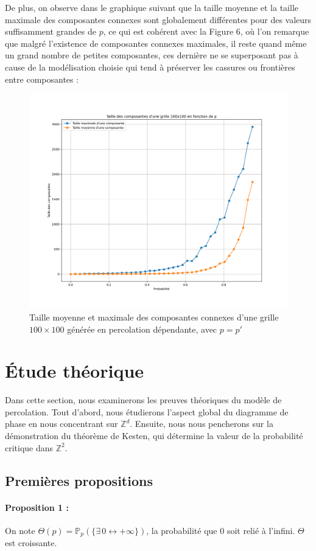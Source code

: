 \documentclass[11pt,a4paper]{article}
\begin{document}
 De plus, on observe dans le graphique suivant que la taille moyenne et la taille maximale des composantes connexes sont globalement différentes pour des valeurs suffisamment grandes de $p$, ce qui est cohérent avec la Figure $6$, où l'on remarque que malgré l'existence de composantes connexes maximales, il reste quand même un grand nombre de petites composantes, ces dernière ne se superposant pas à cause de la modélisation choisie qui tend à préserver les cassures ou frontières entre composantes :

\begin{figure}[H]
    \centering
    \includegraphics[width=0.5 \textwidth]{./Pictures/taille_dep.png}
    \caption{Taille moyenne et maximale des composantes connexes d'une grille $100\times 100$ générée en percolation dépendante, avec $p=p'$}
    \label{fig:phase_dep}
\end{figure}

\section{Étude théorique}

Dans cette section, nous examinerons les preuves théoriques du modèle de percolation. Tout d'abord, nous étudierons l'aspect global du diagramme de phase en nous concentrant sur $\mathbb{Z}^d$. Ensuite, nous nous pencherons sur la démonstration du théorème de Kesten, qui détermine la valeur de la probabilité critique dans $\mathbb{Z}^2$.

\subsection{Premières propositions}
\paragraph{Proposition 1 :}

On note $\Theta \left(p\right) = \mathbb{P}_p \left(\{ \exists\, 0 \leftrightarrow +\infty \}\right)$, la probabilité que $0$ soit relié à l'infini. $\Theta$ est croissante.
\\
\end{document}
